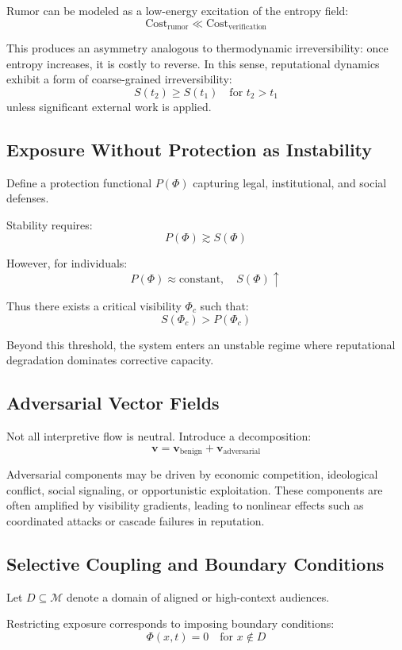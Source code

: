 \documentclass[12pt,a4paper]{article}
\begin{document}
Rumor can be modeled as a low-energy excitation of the entropy field:
\[
\text{Cost}_{\text{rumor}} \ll \text{Cost}_{\text{verification}}
\]

This produces an asymmetry analogous to thermodynamic irreversibility: once entropy increases, it is costly to reverse. In this sense, reputational dynamics exhibit a form of coarse-grained irreversibility:
\[
S(t_2) \geq S(t_1) \quad \text{for } t_2 > t_1
\]
unless significant external work is applied.

\subsection{Exposure Without Protection as Instability}

Define a protection functional $P(\Phi)$ capturing legal, institutional, and social defenses.

Stability requires:
\[
P(\Phi) \gtrsim S(\Phi)
\]

However, for individuals:
\[
P(\Phi) \approx \text{constant}, \quad S(\Phi) \uparrow
\]

Thus there exists a critical visibility $\Phi_c$ such that:
\[
S(\Phi_c) > P(\Phi_c)
\]

Beyond this threshold, the system enters an unstable regime where reputational degradation dominates corrective capacity.

\subsection{Adversarial Vector Fields}

Not all interpretive flow is neutral. Introduce a decomposition:
\[
\mathbf{v} = \mathbf{v}_{\text{benign}} + \mathbf{v}_{\text{adversarial}}
\]

Adversarial components may be driven by economic competition, ideological conflict, social signaling, or opportunistic exploitation. These components are often amplified by visibility gradients, leading to nonlinear effects such as coordinated attacks or cascade failures in reputation.

\subsection{Selective Coupling and Boundary Conditions}

Let $D \subseteq \mathcal{M}$ denote a domain of aligned or high-context audiences.

Restricting exposure corresponds to imposing boundary conditions:
\[
\Phi(x,t) = 0 \quad \text{for } x \notin D
\]
\end{document}
